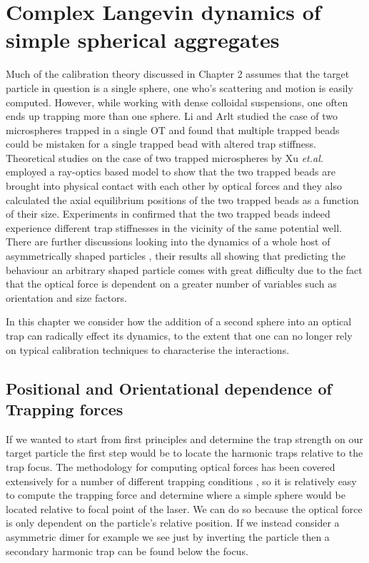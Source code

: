 \documentclass[a4paper,oneside,11pt]{book}
\begin{document}

\setcounter{chapter}{3}
\chapter{Complex Langevin dynamics of simple spherical aggregates}
Much of the calibration theory discussed in Chapter 2 assumes that the target particle in question is a single sphere, one who's scattering and motion is easily computed. However, while working with dense colloidal suspensions, one often ends up trapping more than one sphere. Li and Arlt \cite{Li2008} studied the case of two microspheres trapped in a single OT and found that multiple trapped beads could be mistaken for a single trapped bead with altered trap stiffness. Theoretical studies on the case of two trapped microspheres by Xu \textit{et.al.} \cite{Xu2005} employed a ray-optics based model to show that the two trapped beads are brought into physical contact with each other by optical forces and they also calculated the axial equilibrium positions of the two trapped beads as a function of their size. Experiments in \cite{Praveen2016} confirmed that the two trapped beads indeed experience different trap stiffnesses in the vicinity of the same potential well. There are further discussions looking into the dynamics of a whole host of asymmetrically shaped particles \cite{Loudet2014, ShengHua2005, Chetana2022}, their results all showing that predicting the behaviour an arbitrary shaped particle comes with great difficulty due to the fact that the optical force is dependent on a greater number of variables such as orientation and size factors.

In this chapter we consider how the addition of a second sphere into an optical trap can radically effect its dynamics, to the extent that one can no longer rely on typical calibration techniques to characterise the interactions.

\section{Positional and Orientational dependence of Trapping forces}
If we wanted to start from first principles and determine the trap strength on our target particle the first step would be to locate the harmonic traps relative to the trap focus. The methodology for computing optical forces has been covered extensively for a number of different trapping conditions \cite{RanhaNeves2019}, so it is relatively easy to compute the trapping force and determine where a simple sphere would be located relative to focal point of the laser. We can do so because the optical force is only dependent on the particle's relative position. If we instead consider a asymmetric dimer for example we see just by inverting the particle then a secondary harmonic trap can be found below the focus.
\end{document}
